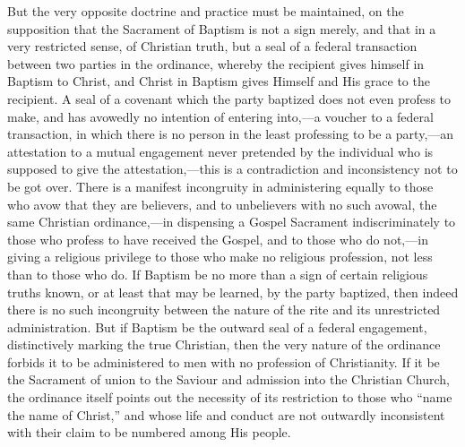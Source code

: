 \documentclass[]{book}
\begin{document}
But the very opposite doctrine and practice must be maintained, on the supposition that the Sacrament of Baptism is not a sign merely, and that in a very restricted sense, of Christian truth, but a seal of a federal transaction between two parties in the ordinance, whereby the recipient gives himself in Baptism to Christ, and Christ in Baptism gives Himself and His grace to the recipient. A seal of a covenant which the party baptized does not even profess to make, and has avowedly no intention of entering into,---a voucher to a federal transaction, in which there is no person in the least professing to be a party,---an attestation to a mutual engagement never pretended by the individual who is supposed to give the attestation,---this is a contradiction and inconsistency not to be got over. There is a manifest incongruity in administering equally to those who avow that they are believers, and to unbelievers with no such avowal, the same Christian ordinance,---in dispensing a Gospel Sacrament indiscriminately to those who profess to have received the Gospel, and to those who do not,---in giving a religious privilege to those who make no religious profession, not less than to those who do. If Baptism be no more than a sign of certain religious truths known, or at least that may be learned, by the party baptized, then indeed there is no such incongruity between the nature of the rite and its unrestricted administration. But if Baptism be the outward seal of a federal engagement, distinctively marking the true Christian, then the very nature of the ordinance forbids it to be administered to men with no profession of Christianity. If it be the Sacrament of union to the Saviour and admission into the Christian Church, the ordinance itself points out the necessity of its restriction to those who ``name the name of Christ,'' and whose life and conduct are not outwardly inconsistent with their claim to be numbered among His people.
\end{document}
